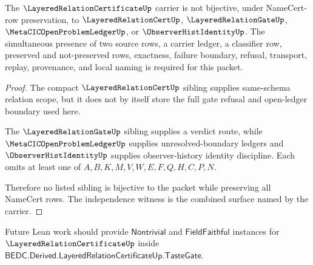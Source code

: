 \begin{theorem}
\label{thm:layered-relation-certificate-sibling-independence}
The $\LayeredRelationCertificateUp$ carrier is not bijective, under NameCert-row preservation, to $\LayeredRelationCertUp$, $\LayeredRelationGateUp$, $\MetaCICOpenProblemLedgerUp$, or $\ObserverHistIdentityUp$. The simultaneous presence of two source rows, a carrier ledger, a classifier row, preserved and not-preserved rows, exactness, failure boundary, refusal, transport, replay, provenance, and local naming is required for this packet.
\end{theorem}
\begin{proof}
The compact $\LayeredRelationCertUp$ sibling supplies same-schema relation scope, but it does not by itself store the full gate refusal and open-ledger boundary used here.

The $\LayeredRelationGateUp$ sibling supplies a verdict route, while $\MetaCICOpenProblemLedgerUp$ supplies unresolved-boundary ledgers and $\ObserverHistIdentityUp$ supplies observer-history identity discipline. Each omits at least one of $A,B,K,M,V,W,E,F,Q,H,C,P,N$.

Therefore no listed sibling is bijective to the packet while preserving all NameCert rows. The independence witness is the combined surface named by the carrier.
\end{proof}



Future Lean work should provide $\mathsf{Nontrivial}$ and $\mathsf{FieldFaithful}$ instances for $\LayeredRelationCertificateUp$ inside $\mathsf{BEDC.Derived.LayeredRelationCertificateUp.TasteGate}$.


